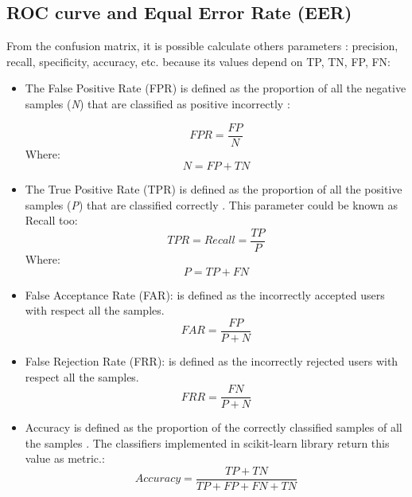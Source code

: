 \subsection{ROC curve and Equal Error Rate (EER)}
From the confusion matrix, it is possible calculate others parameters \cite{Sokolova}: precision, recall, specificity, accuracy, etc. because its values depend on TP, TN, FP, FN:\\

\begin{itemize}
\item The False Positive Rate (FPR) is defined as the proportion of all the negative samples (\textit{N}) that are classified as positive incorrectly \cite{ROC}:

\begin{equation}
FPR = \frac{FP}{N}
\end{equation}
Where:
 \begin{equation}
  N = FP + TN
\end{equation}

\item The True Positive Rate (TPR) is defined as the proportion of all the positive samples (\textit{P}) that are classified correctly \cite{ROC}. This parameter could be known as Recall too:
\begin{equation}
TPR = Recall = \frac{TP}{P}
\end{equation}
Where:
 \begin{equation}
  P = TP + FN
\end{equation}
\item False Acceptance Rate (FAR): is defined as the incorrectly accepted users with respect all the samples.
\begin{equation}
  FAR = \frac{FP}{P + N}
\end{equation}

\item False Rejection Rate (FRR): is defined as the incorrectly rejected users with respect all the samples.
\begin{equation}
  FRR = \frac{FN}{P + N}
\end{equation}


\item Accuracy is defined as the proportion of the correctly classified samples of all the samples \cite{Sokolova}. The classifiers implemented in scikit-learn library return this value as metric.:
\begin{equation}
  Accuracy = \frac{TP + TN}{TP + FP + FN + TN}
\end{equation}
\end{itemize}

